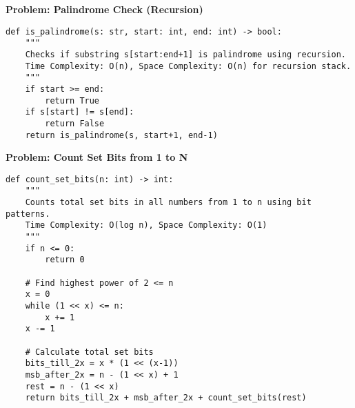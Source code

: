 % 
% 
\noindent\textbf{Problem: Palindrome Check (Recursion)}
\begin{verbatim}
def is_palindrome(s: str, start: int, end: int) -> bool:
    """
    Checks if substring s[start:end+1] is palindrome using recursion.
    Time Complexity: O(n), Space Complexity: O(n) for recursion stack.
    """
    if start >= end:
        return True
    if s[start] != s[end]:
        return False
    return is_palindrome(s, start+1, end-1)
\end{verbatim}

\noindent\textbf{Problem: Count Set Bits from 1 to N}
\begin{verbatim}
def count_set_bits(n: int) -> int:
    """
    Counts total set bits in all numbers from 1 to n using bit patterns.
    Time Complexity: O(log n), Space Complexity: O(1)
    """
    if n <= 0:
        return 0
        
    # Find highest power of 2 <= n
    x = 0
    while (1 << x) <= n:
        x += 1
    x -= 1
    
    # Calculate total set bits
    bits_till_2x = x * (1 << (x-1))
    msb_after_2x = n - (1 << x) + 1
    rest = n - (1 << x)
    return bits_till_2x + msb_after_2x + count_set_bits(rest)
\end{verbatim}

